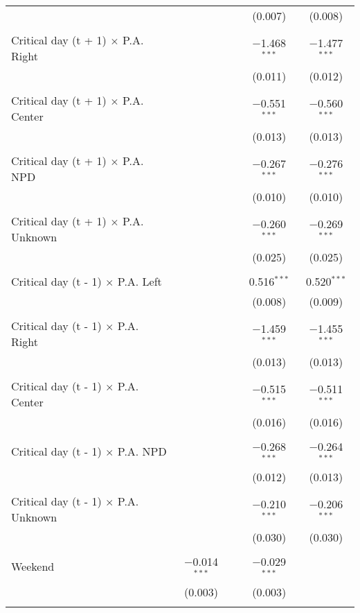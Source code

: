 \documentclass[
]{article}
\begin{document}
\begin{table}[!htbp]
{\begin{tabular}{@{\extracolsep{5pt}}lcccc}
  &  &  & (0.007) & (0.008) \\ 
  & & & & \\ 
 Critical day (t + 1) $\times$ P.A. Right &  &  & $-$1.468$^{***}$ & $-$1.477$^{***}$ \\ 
  &  &  & (0.011) & (0.012) \\ 
  & & & & \\ 
 Critical day (t + 1) $\times$ P.A. Center &  &  & $-$0.551$^{***}$ & $-$0.560$^{***}$ \\ 
  &  &  & (0.013) & (0.013) \\ 
  & & & & \\ 
 Critical day (t + 1) $\times$ P.A. NPD &  &  & $-$0.267$^{***}$ & $-$0.276$^{***}$ \\ 
  &  &  & (0.010) & (0.010) \\ 
  & & & & \\ 
 Critical day (t + 1) $\times$ P.A. Unknown &  &  & $-$0.260$^{***}$ & $-$0.269$^{***}$ \\ 
  &  &  & (0.025) & (0.025) \\ 
  & & & & \\ 
 Critical day (t - 1) $\times$ P.A. Left &  &  & 0.516$^{***}$ & 0.520$^{***}$ \\ 
  &  &  & (0.008) & (0.009) \\ 
  & & & & \\ 
 Critical day (t - 1) $\times$ P.A. Right &  &  & $-$1.459$^{***}$ & $-$1.455$^{***}$ \\ 
  &  &  & (0.013) & (0.013) \\ 
  & & & & \\ 
 Critical day (t - 1) $\times$ P.A. Center &  &  & $-$0.515$^{***}$ & $-$0.511$^{***}$ \\ 
  &  &  & (0.016) & (0.016) \\ 
  & & & & \\ 
 Critical day (t - 1) $\times$ P.A. NPD &  &  & $-$0.268$^{***}$ & $-$0.264$^{***}$ \\ 
  &  &  & (0.012) & (0.013) \\ 
  & & & & \\ 
 Critical day (t - 1) $\times$ P.A. Unknown &  &  & $-$0.210$^{***}$ & $-$0.206$^{***}$ \\ 
  &  &  & (0.030) & (0.030) \\ 
  & & & & \\ 
 Weekend & $-$0.014$^{***}$ &  & $-$0.029$^{***}$ &  \\ 
  & (0.003) &  & (0.003) &  \\ 
  & & & & \\ 

\end{tabular}}
\end{table}
\end{document}
